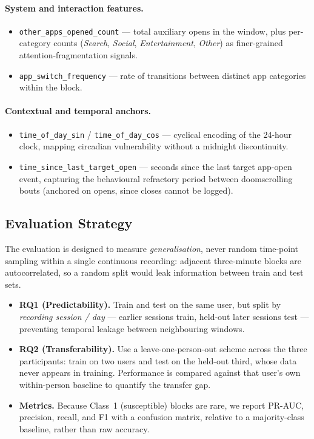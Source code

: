 \documentclass[runningheads]{llncs}
\begin{document}
\paragraph{System and interaction features.}
\begin{itemize}
    \item \texttt{other\_apps\_opened\_count} --- total auxiliary opens in the window, plus
          per-category counts (\emph{Search}, \emph{Social}, \emph{Entertainment},
          \emph{Other}) as finer-grained attention-fragmentation signals.
    \item \texttt{app\_switch\_frequency} --- rate of transitions between distinct app
          categories within the block.
\end{itemize}

\paragraph{Contextual and temporal anchors.}
\begin{itemize}
    \item \texttt{time\_of\_day\_sin} / \texttt{time\_of\_day\_cos} --- cyclical encoding of
          the 24-hour clock, mapping circadian vulnerability without a midnight discontinuity.
    \item \texttt{time\_since\_last\_target\_open} --- seconds since the last target app-open
          event, capturing the behavioural refractory period between doomscrolling bouts
          (anchored on opens, since closes cannot be logged).
\end{itemize}

\subsection{Evaluation Strategy}\label{sec:eval}

The evaluation is designed to measure \emph{generalisation}, never random time-point sampling
within a single continuous recording: adjacent three-minute blocks are autocorrelated, so a
random split would leak information between train and test sets.

\begin{itemize}
    \item \textbf{RQ1 (Predictability).} Train and test on the same user, but split by
          \emph{recording session / day} --- earlier sessions train, held-out later sessions
          test --- preventing temporal leakage between neighbouring windows.
    \item \textbf{RQ2 (Transferability).} Use a leave-one-person-out scheme across the three
          participants: train on two users and test on the held-out third, whose data never
          appears in training. Performance is compared against that user's own within-person
          baseline to quantify the transfer gap.
    \item \textbf{Metrics.} Because Class~1 (susceptible) blocks are rare, we report PR-AUC,
          precision, recall, and F1 with a confusion matrix, relative to a majority-class
          baseline, rather than raw accuracy.
\end{itemize}
\end{document}
